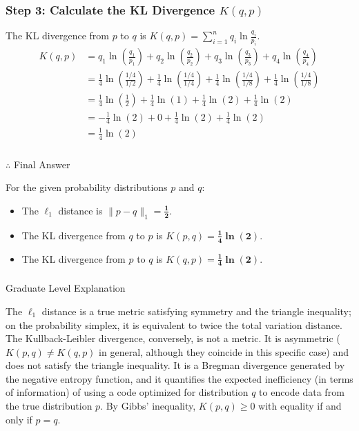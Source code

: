 \documentclass{article}
\begin{document}
\subsubsection*{Step 3: Calculate the KL Divergence $K(q, p)$}
\parbox{\textwidth}{The KL divergence from $p$ to $q$ is $K(q, p) = \sum_{i=1}^n q_i \ln \frac{q_i}{p_i}$.
\begin{align*}
    K(q, p) &= q_1 \ln\left(\frac{q_1}{p_1}\right) + q_2 \ln\left(\frac{q_2}{p_2}\right) + q_3 \ln\left(\frac{q_3}{p_3}\right) + q_4 \ln\left(\frac{q_4}{p_4}\right) \\
    &= \frac{1}{4} \ln\left(\frac{1/4}{1/2}\right) + \frac{1}{4} \ln\left(\frac{1/4}{1/4}\right) + \frac{1}{4} \ln\left(\frac{1/4}{1/8}\right) + \frac{1}{4} \ln\left(\frac{1/4}{1/8}\right) \\
    &= \frac{1}{4} \ln\left(\frac{1}{2}\right) + \frac{1}{4} \ln(1) + \frac{1}{4} \ln(2) + \frac{1}{4} \ln(2) \\
    &= -\frac{1}{4} \ln(2) + 0 + \frac{1}{4} \ln(2) + \frac{1}{4} \ln(2) \\
    &= \frac{1}{4} \ln(2)
\end{align*}}

\subsubsection*{\normalfont}{$\therefore$ Final Answer}\\
\parbox{\textwidth}{For the given probability distributions $p$ and $q$:
\begin{itemize}
    \item The $\ell_1$ distance is $\|p-q\|_1 = \mathbf{\frac{1}{2}}$.
    \item The KL divergence from $q$ to $p$ is $K(p, q) = \mathbf{\frac{1}{4} \ln(2)}$.
    \item The KL divergence from $p$ to $q$ is $K(q, p) = \mathbf{\frac{1}{4} \ln(2)}$.
\end{itemize}}

\subsubsection*{\normalfont}{Graduate Level Explanation}\\
\parbox{\textwidth}{The $\ell_1$ distance is a true metric satisfying symmetry and the triangle inequality; on the probability simplex, it is equivalent to twice the total variation distance. The Kullback-Leibler divergence, conversely, is not a metric. It is asymmetric ($K(p,q) \neq K(q,p)$ in general, although they coincide in this specific case) and does not satisfy the triangle inequality. It is a Bregman divergence generated by the negative entropy function, and it quantifies the expected inefficiency (in terms of information) of using a code optimized for distribution $q$ to encode data from the true distribution $p$. By Gibbs' inequality, $K(p,q) \geq 0$ with equality if and only if $p=q$.}
\end{document}
